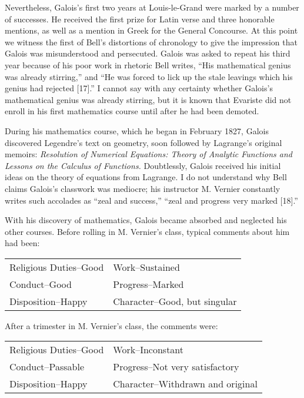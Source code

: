 \documentclass[12pt]{article}
\begin{document}
Nevertheless, Galois's first two years at Louis-le-Grand were marked by a number of successes. He received the first prize for Latin verse and three honorable mentions, as well as a mention in Greek for the General Concourse. At this point we witness the first of Bell's distortions of chronology to give the impression that Galois was misunderstood and persecuted. Galois was asked to repeat his third year because of his poor work in rhetoric Bell writes, ``His mathematical genius was already stirring,'' and ``He was forced to lick up the stale leavings which his genius had rejected [17].'' I cannot say with any certainty whether Galois's mathematical genius was already stirring, but it is known that Evariste did not enroll in his first mathematics course until after he had been demoted.

During his mathematics course, which he began in February 1827, Galois discovered Legendre's text on geometry, soon followed by Lagrange's original memoirs: \emph{Resolution of Numerical Equations: Theory of Analytic Functions and Lessons on the Calculus of Functions.} Doubtlessly, Galois received his initial ideas on the theory of equations from Lagrange. I do not understand why Bell claims Galois's classwork was mediocre; his instructor M. Vernier constantly writes such accolades as ``zeal and success,'' ``zeal and progress very marked [18].''

With his discovery of mathematics, Galois became absorbed and neglected his other courses. Before rolling in M. Vernier's class, typical comments about him had been:

\medskip
\begin{tabular}{ll}
Religious Duties--Good &Work--Sustained\\
Conduct--Good & Progress--Marked\\
Disposition--Happy & Character--Good, but singular
\end{tabular}
\medskip

\noindent
After a trimester in M. Vernier's class, the comments were:

\medskip
\begin{tabular}{ll}
Religious Duties--Good & Work--Inconstant \\
Conduct--Passable & Progress--Not very satisfactory \\
Disposition--Happy & Character--Withdrawn and original\\
\end{tabular}
\medskip
\end{document}
